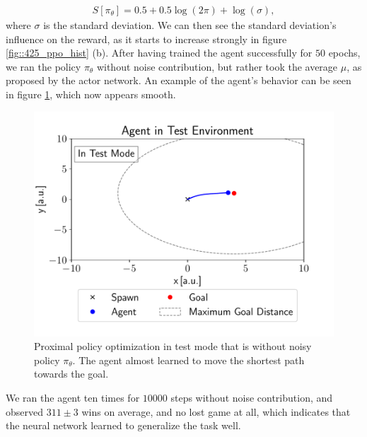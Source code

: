 \begin{align}
	S[\pi_\theta] = 0.5 + 0.5\log(2\pi)+\log(\sigma),
\end{align}
where $\sigma$ is the standard deviation. We can then see the standard deviation's influence on the reward, as it starts to increase strongly in figure \ref{fig::425_ppo_hist} (b). After having trained the agent successfully for $50$ epochs, we ran the policy $\pi_\theta$ without noise contribution, but rather took the average $\mu$, as proposed by the actor network. An example of the agent's behavior can be seen in figure \ref{fig::425_ppo_test}, which now appears smooth. 
\begin{figure}[h!]
	\centering
	\includegraphics[scale=.45]{chapters/04_experiments/02_autonomous_walking/test_mode.pdf}
	\caption{Proximal policy optimization in test mode that is without noisy policy $\pi_\theta$. The agent almost learned to move the shortest path towards the goal.}	
	\label{fig::425_ppo_test}
\end{figure}
We ran the agent ten times for $10000$ steps without noise contribution, and observed $311\pm3$ wins on average, and no lost game at all, which indicates that the neural network learned to generalize the task well.